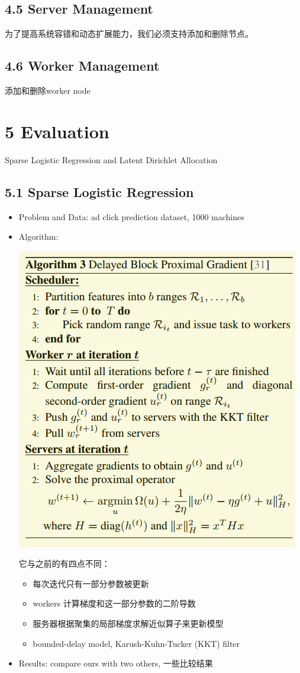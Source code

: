 \documentclass[11pt]{article}
\begin{document}
\subsection{4.5 Server Management}
\label{sec:org3533988}
为了提高系统容错和动态扩展能力，我们必须支持添加和删除节点。
\subsection{4.6 Worker Management}
\label{sec:org306c8f4}
添加和删除worker node
\section{5 Evaluation}
\label{sec:org87b3749}
Sparse Logistic Regression and Latent Dirichlet Allocation
\subsection{5.1 Sparse Logistic Regression}
\label{sec:org1521f85}
\begin{itemize}
\item Problem and Data: ad click prediction dataset, 1000 machines
\item Algorithm:
\begin{center}
\includegraphics[width=.9\linewidth]{PS.org_imgs/20201110_214356_4k00Hx.png}
\end{center} 
它与之前的有四点不同：
\begin{itemize}
\item 每次迭代只有一部分参数被更新
\item workers 计算梯度和这一部分参数的二阶导数
\item 服务器根据聚集的局部梯度求解近似算子来更新模型
\item bounded-delay model, Karush-Kuhn-Tucker (KKT) filter
\end{itemize}
\item Results:
compare ours with two others, 一些比较结果
\end{itemize}
\end{document}
